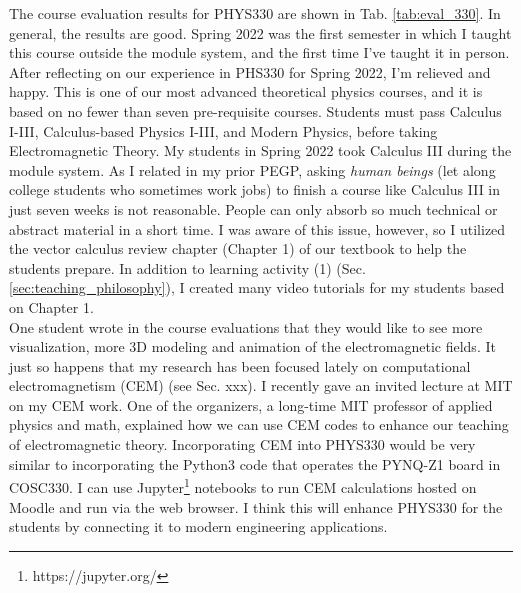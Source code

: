 \documentclass[../../main.tex]{subfiles}
\begin{document}
The course evaluation results for PHYS330 are shown in Tab. \ref{tab:eval_330}.  In general, the results are good.  Spring 2022 was the first semester in which I taught this course outside the module system, and the first time I've taught it in person.  After reflecting on our experience in PHS330 for Spring 2022, I'm relieved and happy.  This is one of our most advanced theoretical physics courses, and it is based on no fewer than seven pre-requisite courses.  Students must pass Calculus I-III, Calculus-based Physics I-III, and Modern Physics, before taking Electromagnetic Theory.  My students in Spring 2022 took Calculus III during the module system.  As I related in my prior PEGP, asking \textit{human beings} (let along college students who sometimes work jobs) to finish a course like Calculus III in just seven weeks is not reasonable.  People can only absorb so much technical or abstract material in a short time.  I was aware of this issue, however, so I utilized the vector calculus review chapter (Chapter 1) of our textbook to help the students prepare.  In addition to learning activity (1) (Sec. \ref{sec:teaching_philosophy}), I created many video tutorials for my students based on Chapter 1.
\\
\vspace{0.25cm}
One student wrote in the course evaluations that they would like to see more visualization, more 3D modeling and animation of the electromagnetic fields.  It just so happens that my research has been focused lately on computational electromagnetism (CEM) (see Sec. xxx).  I recently gave an invited lecture at MIT on my CEM work.  One of the organizers, a long-time MIT professor of applied physics and math, explained how we can use CEM codes to enhance our teaching of electromagnetic theory.  Incorporating CEM into PHYS330 would be very similar to incorporating the Python3 code that operates the PYNQ-Z1 board in COSC330.  I can use Jupyter\footnote{https://jupyter.org/} notebooks to run CEM calculations hosted on Moodle and run via the web browser.  I think this will enhance PHYS330 for the students by connecting it to modern engineering applications.
\end{document}
